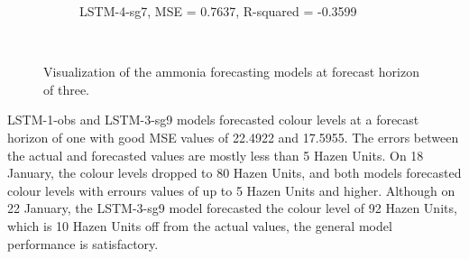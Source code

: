 \begin{figure}[!ht]
\begin{subfigure}[t]{0.75\textwidth}
    \caption{LSTM-4-sg7, MSE = 0.7637, R-squared = -0.3599} \label{fig:nh3-lstm-4-fc3}
  \end{subfigure}\\
\caption{Visualization of the ammonia forecasting models at forecast horizon of three.} \label{fig:nh3-forecast-fc3}
\end{figure}

LSTM-1-obs and LSTM-3-sg9 models forecasted colour levels at a forecast horizon of one with good MSE values of 22.4922 and 17.5955. The errors between the actual and forecasted values are mostly less than 5 Hazen Units. On 18 January, the colour levels dropped to 80 Hazen Units, and both models forecasted colour levels with errours values of up to 5 Hazen Units and higher. Although on 22 January, the LSTM-3-sg9 model forecasted the colour level of 92 Hazen Units, which is 10 Hazen Units off from the actual values, the general model performance is satisfactory. 

